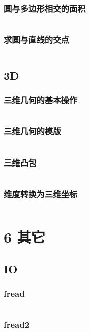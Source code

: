\documentclass{article}
\begin{document}
\subsubsection{圆与多边形相交的面积}
\inputminted{c++}{/home/zzuzxy/t2/Template1.0/5 几何/2D/圆与多边形相交的面积.cpp}
\subsubsection{求圆与直线的交点}
\inputminted{c++}{/home/zzuzxy/t2/Template1.0/5 几何/2D/求圆与直线的交点.cpp}
\subsection{3D}
\subsubsection{三维几何的基本操作}
\inputminted{c++}{/home/zzuzxy/t2/Template1.0/5 几何/3D/三维几何的基本操作.cpp}
\subsubsection{三维几何的模版}
\inputminted{c++}{/home/zzuzxy/t2/Template1.0/5 几何/3D/三维几何的模版.cpp}
\subsubsection{三维凸包}
\inputminted{c++}{/home/zzuzxy/t2/Template1.0/5 几何/3D/三维凸包.cpp}
\subsubsection{维度转换为三维坐标}
\inputminted{c++}{/home/zzuzxy/t2/Template1.0/5 几何/3D/维度转换为三维坐标.cpp}
\section{6 其它}
\subsection{IO}
\subsubsection{fread}
\inputminted{c++}{/home/zzuzxy/t2/Template1.0/6 其它/IO/fread.cpp}
\subsubsection{fread2}
\inputminted{c++}{/home/zzuzxy/t2/Template1.0/6 其它/IO/fread2.cpp}
\end{document}
